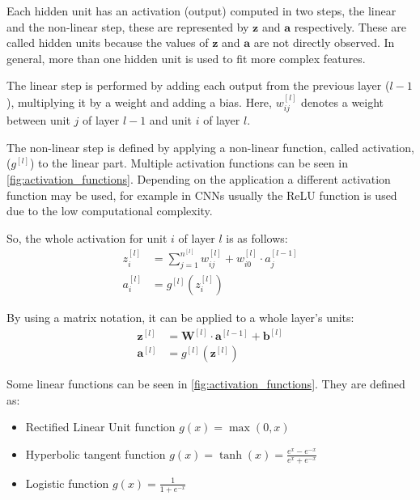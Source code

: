 Each hidden unit has an activation (output) computed in two steps, the linear and the 
non-linear step, these are represented by \( \bm{z} \) and \( \bm{a} \) respectively.
These are called hidden units because the values of \( \bm{z} \) and \( \bm{a} \) are 
not directly observed. In general, more than one hidden unit is used to fit more complex 
features.

The linear step is performed by adding each output from the
previous layer (\( l - 1 \)), multiplying it by a weight and adding a bias.
Here, \(w_{ij}^{[l]}\) denotes a weight between unit \( j \) of layer \( l - 1 \) 
and unit \( i \) of layer \( l \). 

The non-linear step is defined by applying a non-linear function, called activation, 
(\( g^{[l]} \)) to the linear part. 
Multiple activation functions can be seen in \autoref{fig:activation_functions}. Depending
on the application a different activation function may be used, for example in 
\glspl{CNN} usually the ReLU function is used due to the low computational complexity. 
~\cite{neural:bishop}

So, the whole activation for unit \( i \) of layer \( l \) is as follows:
\begin{align*}
  z_i^{[l]} &= \sum_{j = 1}^{n^{[l]}} w_{ij}^{[l]} + w_{i0}^{[l]} \cdot a_j^{[l - 1]} \\
  a_i^{[l]} &= g^{[l]}(z_i^{[l]})
\end{align*}

By using a matrix notation, it can be applied to a whole layer's units:
\begin{align*}
  \bm{z}^{[l]} &= \bm{W}^{[l]} \cdot \bm{a}^{[l - 1]} + \bm{b}^{[l]} \\
  \bm{a}^{[l]} &= g^{[l]}(\bm{z}^{[l]})
\end{align*}

Some linear functions can be seen in \autoref{fig:activation_functions}. They are defined as:
\begin{itemize}
  \item Rectified Linear Unit function 
  \( g(x) = \max(0, x) \)
  \item Hyperbolic tangent function 
  \( g(x) = \tanh(x) = \frac{e^x - e^{-x}}{e^x + e^{-x}}\)
  \item Logistic function 
  \( g(x) = \frac{1}{1 + e^{-x}} \)
\end{itemize}

